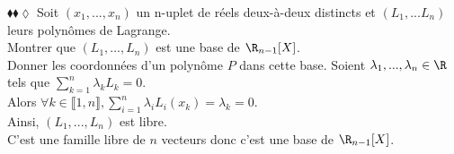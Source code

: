 \documentclass[11pt]{article}
\begin{document}
\vspace*{-0.3cm}

\begin{exercice}{$\blacklozenge\blacklozenge\lozenge$}{}
    Soit $(x_1, ..., x_n)$ un n-uplet de réels deux-à-deux distincts et $(L_1,...L_n)$ leurs polynômes de Lagrange.\\
    Montrer que $(L_1, ..., L_n)$ est une base de $\R_{n-1}[X]$.\\
    Donner les coordonnées d'un polynôme $P$ dans cette base.
    \tcblower
    Soient $\lambda_1, ..., \lambda_n \in \R$ tels que $\sum_{k=1}^n\lambda_kL_k = 0$.\\
    Alors $\forall k \in \llbracket 1, n \rrbracket, \sum_{i=1}^n\lambda_iL_i(x_k) = \lambda_k = 0$.\\
    Ainsi, $(L_1, ..., L_n)$ est libre.\\
    C'est une famille libre de $n$ vecteurs donc c'est une base de $\R_{n-1}[X]$.
\end{exercice}
\end{document}
